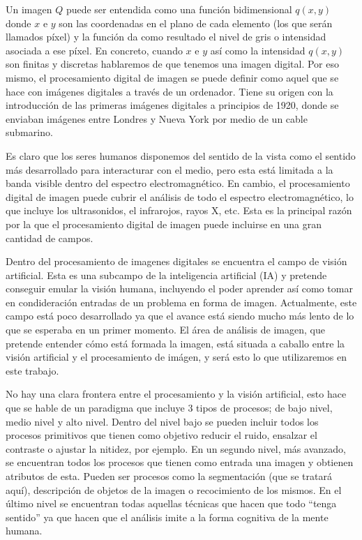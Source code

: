 Un imagen $Q$ puede ser entendida como una función bidimensional $q(x,y)$ donde $x$ e $y$ son las coordenadas en el plano de cada elemento (los que serán llamados píxel) y la función da como resultado el nivel de gris o intensidad asociada a ese píxel. En concreto, cuando $x$ e $y$ así como la intensidad $q(x,y)$ son finitas y discretas hablaremos de que tenemos una imagen digital. Por eso mismo, el procesamiento digital de imagen se puede definir como aquel que se hace con imágenes digitales a través de un ordenador. Tiene su origen con la introducción de las primeras imágenes digitales a principios de 1920, donde se enviaban imágenes entre Londres y Nueva York por medio de un cable submarino.

Es claro que los seres humanos disponemos del sentido de la vista como el sentido más desarrollado para interacturar con el medio, pero esta está limitada a la banda visible dentro del espectro electromagnético. En cambio, el procesamiento digital de imagen puede cubrir el análisis de todo el espectro electromagnético, lo que incluye los ultrasonidos, el infrarojos, rayos X, etc. Esta es la principal razón por la que el procesamiento digital de imagen puede incluirse en una gran cantidad de campos.

Dentro del procesamiento de imagenes digitales se encuentra el campo de visión artificial. Esta es una subcampo de la inteligencia artificial (IA) y pretende conseguir emular la visión humana, incluyendo el poder aprender así como tomar en condideración entradas de un problema en forma de imagen. Actualmente, este campo está poco desarrollado \cite{lib:gonzalez} ya que el avance está siendo mucho más lento de lo que se esperaba en un primer momento. El área de análisis de imagen, que pretende entender cómo está formada la imagen, está situada a caballo entre la visión artificial y el procesamiento de imágen, y será esto lo que utilizaremos en este trabajo.

No hay una clara frontera entre el procesamiento y la visión artificial, esto hace que se hable de un paradigma que incluye 3 tipos de procesos; de bajo nivel, medio nivel y alto nivel. Dentro del nivel bajo se pueden incluir todos los procesos primitivos que tienen como objetivo reducir el ruido, ensalzar el contraste o ajustar la nitidez, por ejemplo. En un segundo nivel, más avanzado, se encuentran todos los procesos que tienen como entrada una imagen y obtienen atributos de esta. Pueden ser procesos como la segmentación (que se tratará aquí), descripción de objetos de la imagen o recocimiento de los mismos. En el último nivel se encuentran todas aquellas técnicas que hacen que todo ``tenga sentido'' ya que hacen que el análisis imite a la forma cognitiva de la mente humana.


